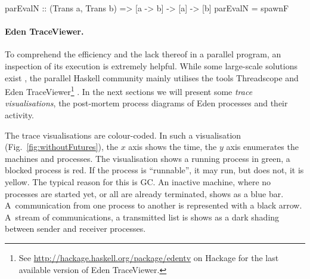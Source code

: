 \begin{code}
parEvalN :: (Trans a, Trans b) => [a -> b] -> [a] -> [b]
parEvalN = spawnF 
\end{code}

\paragraph{Eden TraceViewer.}
\label{sec:edentv}
To comprehend the efficiency and the lack thereof in a parallel program, an inspection of its execution is extremely helpful. While some large-scale solutions exist \cite{Geimer2010}, the parallel Haskell community mainly utilises the tools Threadscope \cite{Wheeler2009} and Eden TraceViewer\footnote{See \url{http://hackage.haskell.org/package/edentv} on Hackage for the last available version of Eden TraceViewer.} \cite{Berthold2007a}. In the next sections we will present some \emph{trace visualisations}, the post-mortem process diagrams of Eden processes and their activity.

The trace visualisations are colour-coded. In such a visualisation (Fig.~\ref{fig:withoutFutures}), the $x$ axis shows the time, the $y$ axis enumerates the machines and processes. The visualisation shows a running process in green, a blocked process is red. If the process is \enquote{runnable}, \ie it may run, but does not, it is yellow. The typical reason for this is GC. An inactive machine, where no processes are started yet, or all are already terminated, shows as a blue bar. A~communication from one process to another is represented with a black arrow. A~stream of communications, \eg a transmitted list is shows as a dark shading between sender and receiver processes.


